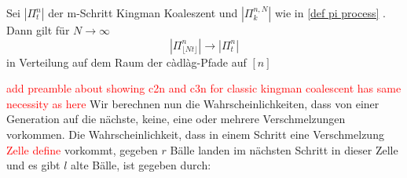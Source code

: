 \begin{theorem}[Haupttheorem]
    Sei $|\Pi^n_t|$ der m-Schritt Kingman Koaleszent und $|\Pi_k^{n,N}|$ wie in \ref{def pi process} . Dann gilt für $N \to \infty$
\begin{equation}
    |\Pi_{\lfloor Nt \rfloor}^n| \to |\Pi_t^n|   
\end{equation}
in Verteilung auf dem Raum der càdlàg-Pfade auf $[n]$
\end{theorem}
\textcolor{red}{add preamble about showing c2n and c3n for classic kingman coalescent has same necessity as here}
Wir berechnen nun die Wahrscheinlichkeiten, dass von einer Generation auf die nächste, keine, eine oder mehrere Verschmelzungen vorkommen. Die Wahrscheinlichkeit, dass in einem Schritt eine Verschmelzung \textcolor{red}{Zelle define} vorkommt, gegeben $r$ Bälle landen im nächsten Schritt in dieser Zelle und es gibt $l$ alte Bälle, ist gegeben durch:

